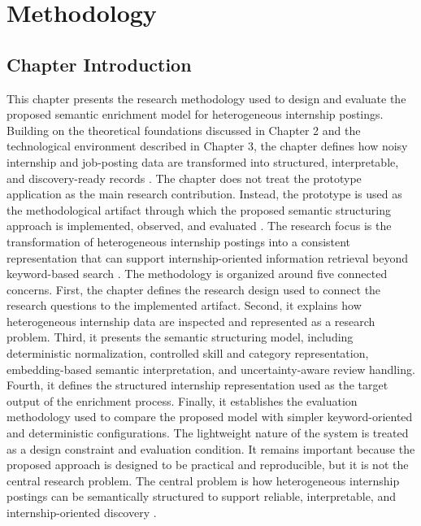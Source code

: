 \chapter{Methodology}

\section{Chapter Introduction}


This chapter presents the research methodology used to design and evaluate the proposed semantic enrichment
model for heterogeneous internship postings. Building on the theoretical foundations discussed in Chapter 2 and
the technological environment described in Chapter 3, the chapter defines how noisy internship and job-posting
data are transformed into structured, interpretable, and discovery-ready records \cite{hevner2004design, peffers2007design}.
The chapter does not treat the prototype application as the main research contribution. Instead, the prototype is
used as the methodological artifact through which the proposed semantic structuring approach is implemented,
observed, and evaluated \cite{hevner2004design}. The research focus is the transformation of heterogeneous internship postings into a
consistent representation that can support internship-oriented information retrieval beyond keyword-based
search \cite{manning2008introduction, baeza2011modern}.
The methodology is organized around five connected concerns. First, the chapter defines the research design
used to connect the research questions to the implemented artifact. Second, it explains how heterogeneous
internship data are inspected and represented as a research problem. Third, it presents the semantic structuring
model, including deterministic normalization, controlled skill and category representation, embedding-based
semantic interpretation, and uncertainty-aware review handling. Fourth, it defines the structured internship
representation used as the target output of the enrichment process. Finally, it establishes the evaluation
methodology used to compare the proposed model with simpler keyword-oriented and deterministic
configurations.
The lightweight nature of the system is treated as a design constraint and evaluation condition. It remains
important because the proposed approach is designed to be practical and reproducible, but it is not the central research
problem. The central problem is how heterogeneous internship postings can be semantically structured to
support reliable, interpretable, and internship-oriented discovery \cite{schwartz2020green, menghani2023efficient}.

